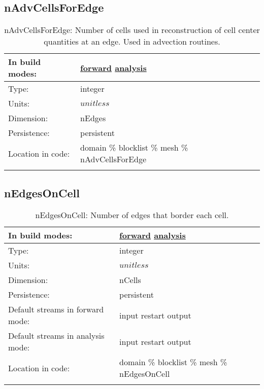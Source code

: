\subsection[nAdvCellsForEdge]{nAdvCellsForEdge}
\label{subsec:var_sec_mesh_nAdvCellsForEdge}
\begin{center}
\begin{longtable}{| p{2.0in} | p{4.0in} |}
        \hline 
        In build modes: & \hyperref[subsec:forward_var_tab_mesh]{forward} \hyperref[subsec:analysis_var_tab_mesh]{analysis} \\
        \hline 
        Type: & integer \\
        \hline 
        Units: & $unitless$ \\
        \hline 
        Dimension: & nEdges \\
        \hline 
        Persistence: & persistent \\
        \hline 
		 Location in code: & domain \% blocklist \% mesh \% nAdvCellsForEdge \\
		 \hline 
    \caption{nAdvCellsForEdge: Number of cells used in reconstruction of cell center quantities at an edge. Used in advection routines.}
\end{longtable}
\end{center}
\subsection[nEdgesOnCell]{nEdgesOnCell}
\label{subsec:var_sec_mesh_nEdgesOnCell}
\begin{center}
\begin{longtable}{| p{2.0in} | p{4.0in} |}
        \hline 
        In build modes: & \hyperref[subsec:forward_var_tab_mesh]{forward} \hyperref[subsec:analysis_var_tab_mesh]{analysis} \\
        \hline 
        Type: & integer \\
        \hline 
        Units: & $unitless$ \\
        \hline 
        Dimension: & nCells \\
        \hline 
        Persistence: & persistent \\
        \hline 
		 Default streams in forward mode: &  input restart output \\
        \hline 
		 Default streams in analysis mode: &  input restart output \\
        \hline 
		 Location in code: & domain \% blocklist \% mesh \% nEdgesOnCell \\
		 \hline 
    \caption{nEdgesOnCell: Number of edges that border each cell.}
\end{longtable}
\end{center}
